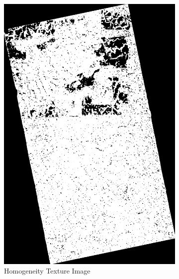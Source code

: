\begin{figure}[H]
\begin{subfigure}[b]{0.4\linewidth}
      \includegraphics[width=\linewidth]{Cap3-Results/sum_and_diff_textures/homogeneityimage.png}
       \caption{ Homogeneity Texture Image}
    \end{subfigure}
    \centering
    \begin{subfigure}[b]{0.4\linewidth}

\end{subfigure}
\end{figure}
